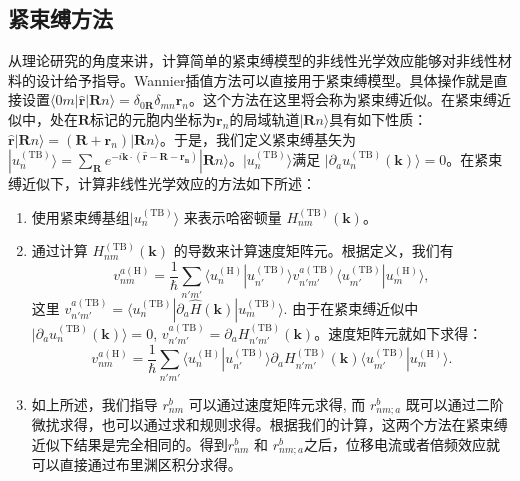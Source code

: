 \subsection{紧束缚方法}

从理论研究的角度来讲，计算简单的紧束缚模型的非线性光学效应能够对非线性材料的设计给予指导\cite{fregoso_quantitative_2016,cook_design_2017}。Wannier插值方法可以直接用于紧束缚模型。具体操作就是直接设置$\langle0m|\hat{\mathbf{r}}|\mathbf{R}n\rangle=\delta_{0\mathbf{R}}\delta_{mn}\mathbf{r}_{n}$。这个方法在这里将会称为紧束缚近似。在紧束缚近似中，处在$\mathbf{R}$标记的元胞内坐标为$\mathbf{r}_{n}$的局域轨道$|\mathbf{R}n\rangle$具有如下性质：$\hat{\mathbf{r}}|\mathbf{R}n\rangle=(\mathbf{R} + \mathbf{r}_{n}) |\mathbf{R}n\rangle$。于是，我们定义紧束缚基矢为$|u_{n}^{(\textrm{TB})}\rangle=\sum_{\mathbf{R}}e^{-i\mathbf{k}\cdot(\hat{\mathbf{r}}-\mathbf{R}-\mathbf{r_{n}})}|\mathbf{R}n\rangle$。$|u_{n}^{(\textrm{TB})}\rangle$满足 $|\partial_{a}u_{n}^{(\textrm{TB})}(\mathbf{k})\rangle=0$。在紧束缚近似下，计算非线性光学效应的方法如下所述：
\begin{enumerate}
	\item 使用紧束缚基组$|u_{n}^{(\textrm{TB})}\rangle$ 来表示哈密顿量 $H^{(\textrm{TB})}_{nm}(\mathbf{k})$。
	\item 通过计算 $H^{(\textrm{TB})}_{nm}(\mathbf{k})$ 的导数来计算速度矩阵元。根据定义，我们有\[
	v_{nm}^{a(\textrm{H})}=\frac{1}{\hbar}\sum_{n'm'}\langle u_{n}^{(\textrm{H})}|u_{n'}^{(\textrm{TB})}\rangle v_{n'm'}^{a(\textrm{TB})}\langle u_{m'}^{(\textrm{TB})}|u_{m}^{(\textrm{H})}\rangle,
	\]这里 $v_{n'm'}^{a(\textrm{TB})} = \langle u_{n}^{(\textrm{TB})}|\partial_{a}\hat{H}(\mathbf{k})|u_{m}^{(\textrm{TB})}\rangle$. 由于在紧束缚近似中 $|\partial_{a}u_{n}^{(\textrm{TB})}(\mathbf{k})\rangle=0$, $v_{n'm'}^{a(\textrm{TB})} = \partial_{a}H_{n'm'}^{(\textrm{TB})}(\mathbf{k})$。速度矩阵元就如下求得：
	\begin{equation}
	v_{nm}^{a(\textrm{H})}=\frac{1}{\hbar}\sum_{n'm'}\langle u_{n}^{(\textrm{H})}|u_{n'}^{(\textrm{TB})}\rangle\partial_{a}H_{n'm'}^{(\textrm{TB})}(\mathbf{k})\langle u_{m'}^{(\textrm{TB})}|u_{m}^{(\textrm{H})}\rangle.\label{eq:v-tight-binding}
	\end{equation}
	\item 如上所述，我们指导 $r_{nm}^{b}$ 可以通过速度矩阵元求得, 而 $r_{nm;a}^{b}$ 既可以通过二阶微扰求得，也可以通过求和规则求得。根据我们的计算，这两个方法在紧束缚近似下结果是完全相同的。得到$r_{nm}^{b}$ 和 $r_{nm;a}^{b}$之后，位移电流或者倍频效应就可以直接通过布里渊区积分求得。
\end{enumerate}

